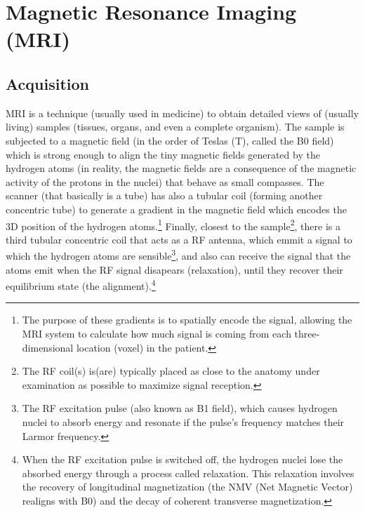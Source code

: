\chapter{Magnetic Resonance Imaging (MRI)}

\section{Acquisition}
\gls{MRI}
\cite{westbrook2018mri,Wu2022MRI_Physics,thePIRL2018NMR_basics,thePIRL2018SpinEcho,thePIRL2018Fourier,thePIRL2018GRE}
is a technique (usually used in medicine) to obtain detailed views of
(usually living) samples (tissues, organs, and even a complete
organism). The sample is subjected to a magnetic field (in the order
of Teslas (T), called the B0 field) which is strong enough to align
the tiny magnetic fields generated by the hydrogen atoms (in reality,
the magnetic fields are a consequence of the magnetic activity of the
protons in the nuclei) that behave as small compasses. The scanner
(that basically is a tube) has also a tubular coil (forming another
concentric tube) to generate a gradient in the magnetic field which
encodes the 3D position of the hydrogen atoms.\footnote{The purpose of
  these gradients is to spatially encode the signal, allowing the MRI
  system to calculate how much signal is coming from each
  three-dimensional location (voxel) in the patient.}  Finally,
closest to the sample\footnote{The RF coil(s) is(are) typically placed
  as close to the anatomy under examination as possible to maximize
  signal reception.}, there is a third tubular concentric coil that
acts as a RF antenna, which emmit a signal to which the hydrogen atoms
are sensible\footnote{The RF excitation pulse (also known as B1
  field), which causes hydrogen nuclei to absorb energy and resonate
  if the pulse's frequency matches their Larmor frequency.}, and also
can receive the signal that the atoms emit when the RF signal
disapears (relaxation), until they recover their equilibrium state
(the alignment).\footnote{When the RF excitation pulse is switched
  off, the hydrogen nuclei lose the absorbed energy through a process
  called relaxation. This relaxation involves the recovery of
  longitudinal magnetization (the NMV (Net Magnetic Vector) realigns
  with B0) and the decay of coherent transverse magnetization.}

